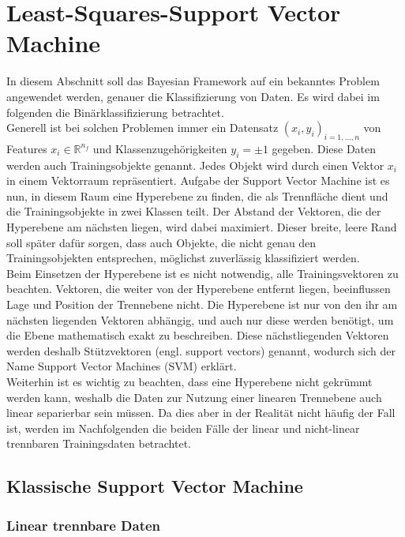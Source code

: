 \newpage
\thispagestyle{plain}
\section{Least-Squares-Support Vector Machine}

In diesem Abschnitt soll das Bayesian Framework auf ein bekanntes Problem angewendet werden, genauer die Klassifizierung von Daten. Es wird dabei im folgenden die Binärklassifizierung betrachtet.\\
Generell ist bei solchen Problemen immer ein Datensatz \((x_i,y_i)_{i=1,\dots,n}\) von Features \(x_i\in\mathbb{R}^{n_f}\) und Klassenzugehörigkeiten \(y_i=\pm1\) gegeben. Diese Daten werden auch Trainingsobjekte genannt. Jedes Objekt wird durch einen Vektor \(x_i\) in einem Vektorraum repräsentiert. Aufgabe der Support Vector Machine ist es nun, in diesem Raum eine Hyperebene zu finden, die als Trennfläche dient und die Trainingsobjekte in zwei Klassen teilt. Der Abstand der Vektoren, die der Hyperebene am nächsten liegen, wird dabei maximiert. Dieser breite, leere Rand soll später dafür sorgen, dass auch Objekte, die nicht genau den Trainingsobjekten entsprechen, möglichst zuverlässig klassifiziert werden.\\[0,5cm]
Beim Einsetzen der Hyperebene ist es nicht notwendig, alle Trainingsvektoren zu beachten. Vektoren, die weiter von der Hyperebene entfernt liegen, beeinflussen Lage und Position der Trennebene nicht. Die Hyperebene ist nur von den ihr am nächsten liegenden Vektoren abhängig, und auch nur diese werden benötigt, um die Ebene mathematisch exakt zu beschreiben. Diese nächstliegenden Vektoren werden deshalb Stützvektoren (engl. support vectors) genannt, wodurch sich der Name Support Vector Machines (SVM) erklärt. \\[0,5cm]
Weiterhin ist es wichtig zu beachten, dass eine Hyperebene nicht gekrümmt werden kann, weshalb die Daten zur Nutzung einer linearen Trennebene auch linear separierbar sein müssen. Da dies aber in der Realität nicht häufig der Fall ist, werden im Nachfolgenden die beiden Fälle der linear und nicht-linear trennbaren Trainingsdaten betrachtet.

\subsection{Klassische Support Vector Machine}

\subsubsection{Linear trennbare Daten}

